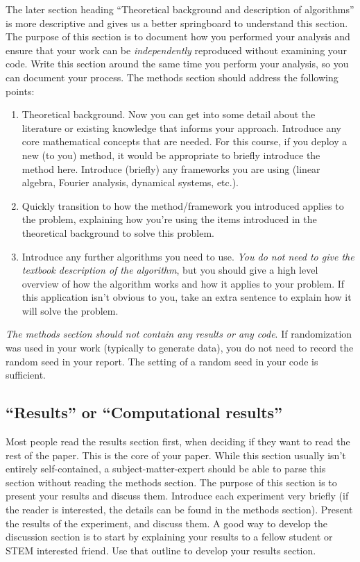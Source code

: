 \documentclass[]{article}
\begin{document}
The later section heading ``Theoretical background and description of algorithms'' is more descriptive and gives us a better springboard to understand this section. The purpose of this section is to document how you performed your analysis and ensure that your work can be \emph{independently} reproduced without examining your code. Write this section around the same time you perform your analysis, so you can document your process. The methods section should address the following points:
\begin{enumerate}
    \item Theoretical background. Now you can get into some detail about the literature or existing knowledge that informs your approach. Introduce any core mathematical concepts that are needed. For this course, if you deploy a new (to you) method, it would be appropriate to briefly introduce the method here. Introduce (briefly) any frameworks you are using (linear algebra, Fourier analysis, dynamical systems, etc.).
    \item Quickly transition to how the method/framework you introduced applies to the problem, explaining how you're using the items introduced in the theoretical background to solve this problem.
    \item Introduce any further algorithms you need to use. \emph{You do not need to give the textbook description of the algorithm}, but you should give a high level overview of how the algorithm works and how it applies to your problem. If this application isn't obvious to you, take an extra sentence to explain how it will solve the problem.
\end{enumerate}

\emph{The methods section should not contain any results or any code}. If randomization was used in your work (typically to generate data), you do not need to record the random seed in your report. The setting of a random seed in your code is sufficient.

\subsection{``Results'' or ``Computational results''}
Most people read the results section first, when deciding if they want to read the rest of the paper. This is the core of your paper.
While this section usually isn't entirely self-contained, a subject-matter-expert should be able to parse this section without reading the methods section. The purpose of this section is to present your results and discuss them. Introduce each experiment very briefly (if the reader is interested, the details can be found in the methods section). Present the results of the experiment, and discuss them. A good way to develop the discussion section is to start by explaining your results to a fellow student or STEM interested friend. Use that outline to develop your results section.
\end{document}
